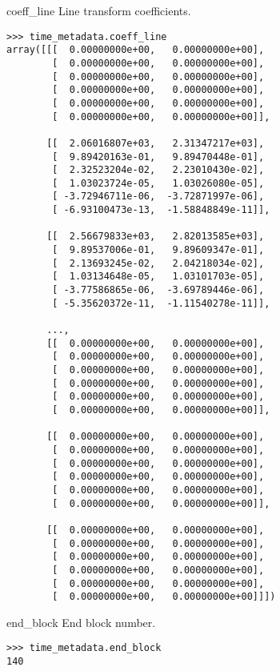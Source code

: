 \documentclass{howto}
\begin{document}
\begin{memberdesc}[double]{coeff_line}
  Line transform coefficients.
  
\begin{verbatim}
>>> time_metadata.coeff_line
array([[[  0.00000000e+00,   0.00000000e+00],
        [  0.00000000e+00,   0.00000000e+00],
        [  0.00000000e+00,   0.00000000e+00],
        [  0.00000000e+00,   0.00000000e+00],
        [  0.00000000e+00,   0.00000000e+00],
        [  0.00000000e+00,   0.00000000e+00]],

       [[  2.06016807e+03,   2.31347217e+03],
        [  9.89420163e-01,   9.89470448e-01],
        [  2.32523204e-02,   2.23010430e-02],
        [  1.03023724e-05,   1.03026080e-05],
        [ -3.72946711e-06,  -3.72871997e-06],
        [ -6.93100473e-13,  -1.58848849e-11]],

       [[  2.56679833e+03,   2.82013585e+03],
        [  9.89537006e-01,   9.89609347e-01],
        [  2.13693245e-02,   2.04218034e-02],
        [  1.03134648e-05,   1.03101703e-05],
        [ -3.77586865e-06,  -3.69789446e-06],
        [ -5.35620372e-11,  -1.11540278e-11]],

       ..., 
       [[  0.00000000e+00,   0.00000000e+00],
        [  0.00000000e+00,   0.00000000e+00],
        [  0.00000000e+00,   0.00000000e+00],
        [  0.00000000e+00,   0.00000000e+00],
        [  0.00000000e+00,   0.00000000e+00],
        [  0.00000000e+00,   0.00000000e+00]],

       [[  0.00000000e+00,   0.00000000e+00],
        [  0.00000000e+00,   0.00000000e+00],
        [  0.00000000e+00,   0.00000000e+00],
        [  0.00000000e+00,   0.00000000e+00],
        [  0.00000000e+00,   0.00000000e+00],
        [  0.00000000e+00,   0.00000000e+00]],

       [[  0.00000000e+00,   0.00000000e+00],
        [  0.00000000e+00,   0.00000000e+00],
        [  0.00000000e+00,   0.00000000e+00],
        [  0.00000000e+00,   0.00000000e+00],
        [  0.00000000e+00,   0.00000000e+00],
        [  0.00000000e+00,   0.00000000e+00]]])
\end{verbatim}
\end{memberdesc}

\begin{memberdesc}[int]{end_block}
  End block number.

\begin{verbatim}
>>> time_metadata.end_block 
140
\end{verbatim}
\end{memberdesc}
\end{document}
